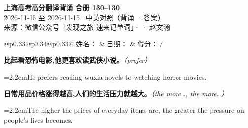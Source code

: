 \documentclass[11pt,a4paper]{article}
\newcommand{\num}[1]{\makebox[1.9em][r]{#1.}\hspace{0.3em}}
\newcommand{\prompt}[1]{\emph{\textcolor{tipblue}{\small（#1）}}}
\begin{document}
\pagestyle{plain}
\begin{center}
{\LARGE\bfseries 上海高考高分翻译背诵 \quad 合册 130–130}\\[0.25em]
{\large 2026-11-15 至 2026-11-15 \quad\ 中英对照（背诵 · 答案）}\\[0.35em]
{\footnotesize 来源：微信公众号「发现之旅 速来记单词」·  · 赵文瀚}
\end{center}

\vspace{0.4em}
\noindent\begin{tabular}{@{}p{0.33\textwidth}@{}p{0.34\textwidth}@{}p{0.33\textwidth}@{}}
姓名：\underline{\hspace{2.0cm}} & 日期：\underline{\hspace{2.0cm}} & 得分：\underline{\hspace{1.4cm}}\,/ \\
\end{tabular}

\vspace{0.5em}

\vspace{0.8em}
\vspace{0.35em}\vspace{0.15em}

\begin{minipage}{\linewidth}

\num{1}\textbf{比起看恐怖电影,他更喜欢读武侠小说。}\prompt{prefer}

\vspace{0.15em}

\noindent\hangindent=2.2em\hspace{2.2em}He prefers reading wuxia novels to watching horror movies.

\end{minipage}

\begin{minipage}{\linewidth}

\num{2}\textbf{日常用品价格涨得越高,人们的生活压力就越大。}\prompt{the more…, the more…}

\vspace{0.15em}

\noindent\hangindent=2.2em\hspace{2.2em}The higher the prices of everyday items are, the greater the pressure on people’s lives becomes.

\end{minipage}
\end{document}
